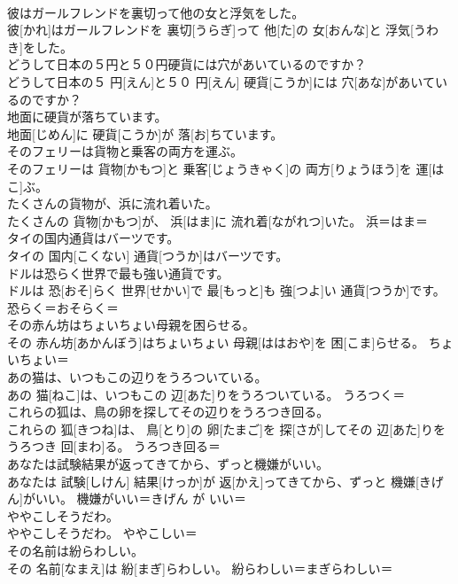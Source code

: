 \documentclass[8pt]{extreport}
\begin{document}
\begin{CJK}{UTF8}{min}
\\	彼はガールフレンドを裏切って他の女と浮気をした。	
\\	彼[かれ]はガールフレンドを 裏切[うらぎ]って 他[た]の 女[おんな]と 浮気[うわき]をした。	
\\	どうして日本の５円と５０円硬貨には穴があいているのですか？	
\\	どうして日本の５ 円[えん]と５０ 円[えん] 硬貨[こうか]には 穴[あな]があいているのですか？	
\\	地面に硬貨が落ちています。	
\\	地面[じめん]に 硬貨[こうか]が 落[お]ちています。	
\\	そのフェリーは貨物と乗客の両方を運ぶ。	
\\	そのフェリーは 貨物[かもつ]と 乗客[じょうきゃく]の 両方[りょうほう]を 運[はこ]ぶ。	
\\	たくさんの貨物が、浜に流れ着いた。	
\\	たくさんの 貨物[かもつ]が、 浜[はま]に 流れ着[ながれつ]いた。	浜＝はま＝ 
\\	タイの国内通貨はバーツです。	
\\	タイの 国内[こくない] 通貨[つうか]はバーツです。	
\\	ドルは恐らく世界で最も強い通貨です。	
\\	ドルは 恐[おそ]らく 世界[せかい]で 最[もっと]も 強[つよ]い 通貨[つうか]です。	恐らく＝おそらく＝ 
\\	その赤ん坊はちょいちょい母親を困らせる。	
\\	その 赤ん坊[あかんぼう]はちょいちょい 母親[ははおや]を 困[こま]らせる。	ちょいちょい＝ 
\\	あの猫は、いつもこの辺りをうろついている。	
\\	あの 猫[ねこ]は、いつもこの 辺[あた]りをうろついている。	うろつく＝ 
\\	これらの狐は、鳥の卵を探してその辺りをうろつき回る。	
\\	これらの 狐[きつね]は、 鳥[とり]の 卵[たまご]を 探[さが]してその 辺[あた]りをうろつき 回[まわ]る。	うろつき回る＝ 
\\	あなたは試験結果が返ってきてから、ずっと機嫌がいい。	
\\	あなたは 試験[しけん] 結果[けっか]が 返[かえ]ってきてから、ずっと 機嫌[きげん]がいい。	機嫌がいい＝きげん が いい＝ 
\\	ややこしそうだわ。	
\\	ややこしそうだわ。	ややこしい＝ 
\\	その名前は紛らわしい。	
\\	その 名前[なまえ]は 紛[まぎ]らわしい。	紛らわしい＝まぎらわしい＝ 

\end{CJK}
\end{document}
